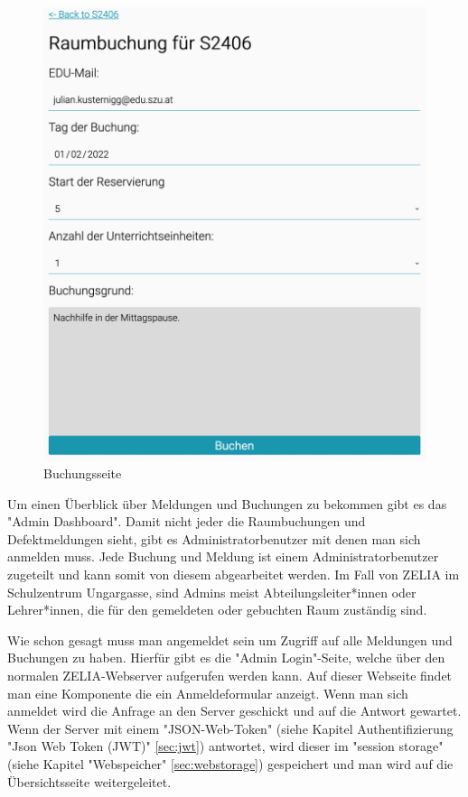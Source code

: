 \begin{figure}[H]
    \centering
    \includegraphics[width=120mm]{media/WebComponents/Buchungsseite_light.png}
    \caption{Buchungsseite}
\end{figure}


\label{sec:webcomplogdash}

Um einen Überblick über Meldungen und Buchungen zu bekommen gibt es das "Admin Dashboard". Damit nicht jeder die Raumbuchungen und Defektmeldungen sieht, gibt es Administratorbenutzer mit denen man sich anmelden muss. Jede Buchung und Meldung ist einem Administratorbenutzer zugeteilt und kann somit von diesem abgearbeitet werden. Im Fall von ZELIA im Schulzentrum Ungargasse, sind Admins meist Abteilungsleiter*innen oder Lehrer*innen, die für den gemeldeten oder gebuchten Raum zuständig sind. 

Wie schon gesagt muss man angemeldet sein um Zugriff auf alle Meldungen und Buchungen zu haben. Hierfür gibt es die "Admin Login"-Seite, welche über den normalen ZELIA-Webserver aufgerufen werden kann. Auf dieser Webseite findet man eine Komponente die ein Anmeldeformular anzeigt. Wenn man sich anmeldet wird die Anfrage an den Server geschickt und auf die Antwort gewartet. Wenn der Server mit einem "JSON-Web-Token" (siehe Kapitel Authentifizierung "Json Web Token (JWT)" \ref{sec:jwt}) antwortet, wird dieser im "session storage" (siehe Kapitel "Webspeicher" \ref{sec:webstorage}) gespeichert und man wird auf die Übersichtsseite weitergeleitet.

